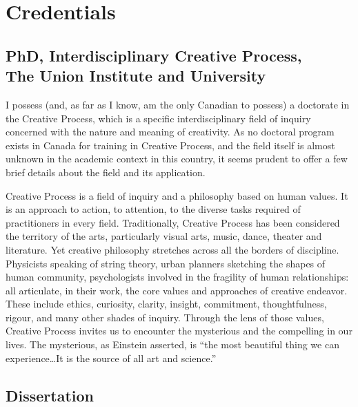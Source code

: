 \documentclass[10pt,DIV09,letterpaper,oneside,headsepline]{scrreprt}
\begin{document}
\chapter{Credentials}

\section{PhD, Interdisciplinary Creative Process,\\ The Union Institute and University}

I possess (and, as far as I know, am the only Canadian to possess) a doctorate in the Creative Process, which is a specific interdisciplinary field of inquiry concerned with the nature and meaning of creativity. As no doctoral program exists in Canada for training in Creative Process, and the field itself is almost unknown in the academic context in this country, it seems prudent to offer a few brief details about the field and its application.

Creative Process is a field of inquiry and a philosophy based on human values. It is an approach to action, to attention, to the diverse tasks required of practitioners in every field. Traditionally, Creative Process has been considered the territory of the arts, particularly visual arts, music, dance, theater and literature. Yet creative philosophy stretches across all the borders of discipline. Physicists speaking of string theory, urban planners sketching the shapes of human community, psychologists involved in the fragility of human relationships: all articulate, in their work, the core values and approaches of creative endeavor. These include ethics, curiosity, clarity, insight, commitment, thoughtfulness, rigour, and many other shades of inquiry. Through the lens of those values, Creative Process invites us to encounter the mysterious and the compelling in our lives. The mysterious, as Einstein asserted, is ``the most beautiful thing we can experience\ldots It is the source of all art and science.''

\section{Dissertation}
\end{document}
